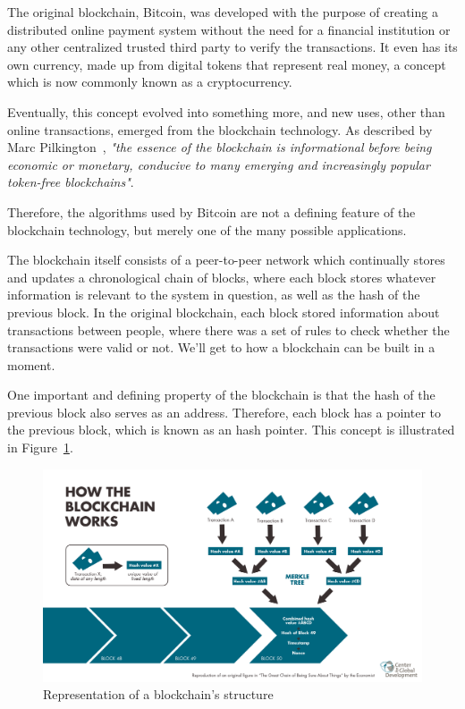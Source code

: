 The original blockchain, Bitcoin, was developed with the purpose of creating a distributed online payment system without the need for a financial institution or any other centralized trusted third party to verify the transactions. It even has its own currency, made up from digital tokens that represent real money, a concept which is now commonly known as a cryptocurrency.

Eventually, this concept evolved into something more, and new uses, other than online transactions, emerged from the blockchain technology. As described by Marc Pilkington~\cite{Pilkington2015}, \textit{"the essence of the blockchain is informational before being economic or monetary, conducive to many emerging and increasingly popular token-free blockchains"}.

Therefore, the algorithms used by Bitcoin are not a defining feature of the blockchain technology, but merely one of the many possible applications.
    
    The blockchain itself consists of a peer-to-peer network which continually stores and updates a chronological chain of blocks, where each block stores whatever information is relevant to the system in question, as well as the hash of the previous block. In the original blockchain, each block stored information about transactions between people, where there was a set of rules to check whether the transactions were valid or not. We'll get to how a blockchain can be built in a moment.
    
    One important and defining property of the blockchain is that the hash of the previous block also serves as an address. Therefore, each block has a pointer to the previous block, which is known as an hash pointer. This concept is illustrated in Figure~\ref{fig:blockchain_workflow}.
    
\begin{figure}[h]
\centering
\includegraphics[scale=0.35]{media/Blockchain_workflow.png}
\caption{Representation of a blockchain's structure}
\label{fig:blockchain_workflow}
\end{figure}

